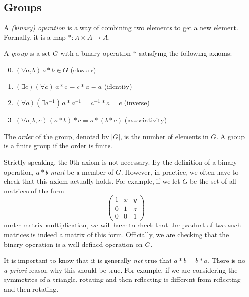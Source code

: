 \documentclass[a4paper]{article}
\begin{document}
\subsection{Groups}
\begin{defi}
  A \emph{(binary) operation} is a way of combining two elements to get a new element. Formally, it is a map $*: A \times A \rightarrow A$.
\end{defi}
\begin{defi}[Group]
  A \emph{group} is a set $G$ with a binary operation $*$ satisfying the following axioms:
  \begin{enumerate}[label=\arabic{*}.]
      \setcounter{enumi}{-1}
    \item $(\forall a, b)\, a*b\in G$ \hfill (closure)
    \item $(\exists e)(\forall a)\, a*e = e*a = a$ \hfill (identity)
    \item $(\forall a)(\exists a^{-1})\, a*a^{-1} = a^{-1}*a = e$ \hfill (inverse)
    \item $(\forall a, b, c)\, (a*b)*c = a*(b*c)$ \hfill (associativity)
  \end{enumerate}
\end{defi}
\begin{defi}
  The \emph{order} of the group, denoted by $|G|$, is the number of elements in $G$. A group is a finite group if the order is finite.
\end{defi}
Strictly speaking, the 0th axiom is not necessary. By the definition of a binary operation, $a*b$ \emph{must} be a member of $G$. However, in practice, we often have to check that this axiom actually holds. For example, if we let $G$ be the set of all matrices of the form
\[
  \begin{pmatrix}
    1 & x & y\\
    0 & 1 & z\\
    0 & 0 & 1
  \end{pmatrix}
\]
under matrix multiplication, we will have to check that the product of two such matrices is indeed a matrix of this form. Officially, we are checking that the binary operation is a well-defined operation on $G$.

It is important to know that it is generally \emph{not} true that $a*b = b*a$. There is no \emph{a priori} reason why this should be true. For example, if we are considering the symmetries of a triangle, rotating and then reflecting is different from reflecting and then rotating.
\end{document}
